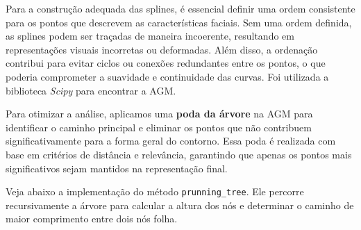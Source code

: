 Para a construção adequada das splines, é essencial definir uma ordem consistente para os pontos que descrevem as características faciais. Sem uma ordem definida, as splines podem ser traçadas de maneira incoerente, resultando em representações visuais incorretas ou deformadas. Além disso, a ordenação contribui para evitar ciclos ou conexões redundantes entre os pontos, o que poderia comprometer a suavidade e continuidade das curvas. Foi utilizada a biblioteca \textit{Scipy} \cite{Scipy} para encontrar a AGM.

Para otimizar a análise, aplicamos uma \textbf{poda da árvore} na AGM para identificar o caminho principal e eliminar os pontos que não contribuem significativamente para a forma geral do contorno. Essa poda é realizada com base em critérios de distância e relevância, garantindo que apenas os pontos mais significativos sejam mantidos na representação final.


Veja abaixo a implementação do método \texttt{prunning\_tree}. Ele percorre recursivamente a árvore para calcular a altura dos nós e determinar o caminho de maior comprimento entre dois nós folha.

